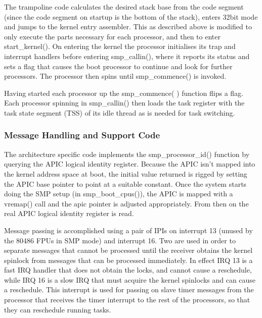 \documentclass[]{article}
\begin{document}
The trampoline code calculates the desired stack base from the code 
segment (since the code segment on startup is the bottom of the stack), 
 enters 32bit mode and jumps to the kernel entry assembler. This as 
described above is modified to only execute the parts necessary for each 
processor, and then to enter start\_kernel(). On entering the kernel the 
processor initialises its trap and interrupt handlers before entering 
smp\_callin(), where it reports its status and sets a flag that causes the 
boot processor to continue and look for further processors. The processor 
then spins until smp\_commence() is invoked.

Having started each processor up the smp\_commence( ) function flips a 
flag. Each processor spinning in smp\_callin() then loads the task register 
with the task state segment (TSS) of its idle thread as is needed for task 
switching.

\subsubsection{Message Handling and Support Code}
The architecture specific code implements the smp\_processor\_id() function 
by querying the APIC logical identity register. Because the APIC isn't 
mapped into the kernel address space at boot, the initial value returned is 
rigged by setting the APIC base pointer to point at a suitable constant. 
Once the system starts doing the SMP setup (in smp\_boot\_cpus()), the APIC 
is mapped with a vremap() call and the apic pointer is adjusted 
appropriately. From then on the real APIC logical identity register is 
read.

Message passing is accomplished using a pair of IPIs on interrupt 13 
(unused by the 80486 FPUs in SMP mode) and interrupt 16. Two are used in 
order to separate messages that cannot be processed until the receiver 
obtains the kernel spinlock from messages that can be processed 
immediately. In effect IRQ 13 is a fast IRQ handler that does not obtain 
the locks, and cannot cause a reschedule, while IRQ 16 is a slow IRQ that 
must acquire the kernel spinlocks and can cause a reschedule. This 
interrupt is used for passing on slave timer messages from the processor 
that receives the timer interrupt to the rest of the processors, so that 
they can reschedule running tasks.
\end{document}
